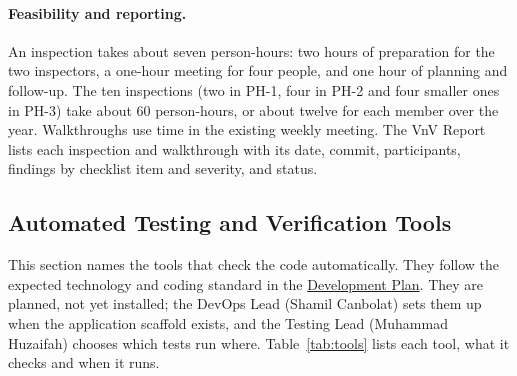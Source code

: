\documentclass[12pt, titlepage]{article}
\begin{document}
\paragraph{Feasibility and reporting.} An inspection takes about seven
person-hours: two hours of preparation for the two inspectors, a one-hour
meeting for four people, and one hour of planning and follow-up. The ten
inspections (two in PH-1, four in PH-2 and four smaller ones in PH-3)
take about 60 person-hours, or about twelve for each member over the year.
Walkthroughs use time in the existing weekly meeting. The VnV Report lists
each inspection and walkthrough with its date, commit, participants,
findings by checklist item and severity, and status.

\subsection{Automated Testing and Verification Tools}
\label{sec:tools}

This section names the tools that check the code automatically. They follow
the expected technology and coding standard in the \href{https://github.com/AHMEDELZARIA/squigglr/blob/main/docs/DevelopmentPlan/DevelopmentPlan.tex}{Development Plan}. They are planned, not yet installed; the DevOps Lead (Shamil
Canbolat) sets them up when the application scaffold exists, and the Testing
Lead (Muhammad Huzaifah) chooses which tests run where. Table~\ref{tab:tools}
lists each tool, what it checks and when it runs.
\end{document}
